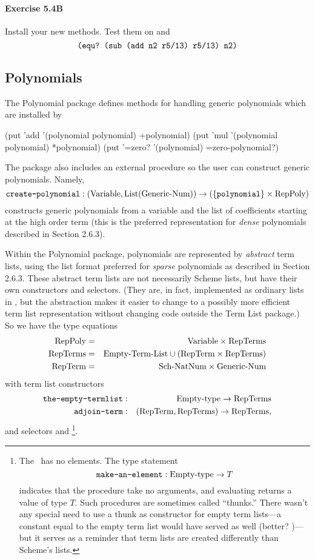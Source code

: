 \paragraph{Exercise 5.4B}
Install your new methods.  Test them on  and
\[\mbox{\tt (equ?\ (sub (add n2 r5/13) r5/13) n2)}\]


\subsection{Polynomials}
The Polynomial package defines methods for handling generic polynomials
which are installed by

\beginlisp
(put 'add '(polynomial polynomial) +polynomial)
(put 'mul '(polynomial polynomial) *polynomial)
(put '=zero? '(polynomial) =zero-polynomial?)
\endlisp

The package also includes an external procedure so the user can construct
generic polynomials.  Namely,
\[\mbox{\tt create-polynomial}: (\mbox{Variable}, \mbox{List}(\mbox{Generic-\-Num})) \rightarrow (\{\mbox{\tt polynomial}\}\times
\mbox{RepPoly})\]
constructs generic polynomials from a variable and the list of
coefficients starting at the high order term (this is the preferred
representation for {\em dense} polynomials described in Section 2.6.3).

Within the Polynomial package, polynomials are represented by {\em
abstract} term lists, using the list format preferred for {\em sparse}
polynomials as described in Section 2.6.3.  These abstract term lists are
not necessarily Scheme lists, but have their own constructors and
selectors.  (They are, in fact, implemented as ordinary lists in
, but the abstraction makes it easier to change to a
possibly more efficient term list representation without changing code
outside the Term List package.)  So we have the type equations
\begin{eqnarray*}
\mbox{RepPoly}  & = & \mbox{Variable}\times\mbox{RepTerms}\\
\mbox{RepTerms}  & = & \mbox{Empty-Term-List}  \cup  (\mbox{RepTerm} \times \mbox{RepTerms})\\
\mbox{RepTerm} & = & \mbox{Sch-\-NatNum} \times \mbox{Generic-\-Num}
\end{eqnarray*}
with term list constructors
\begin{eqnarray*}
\mbox{\tt the-empty-termlist} &:& \mbox{Empty-type} \rightarrow \mbox{RepTerms}\\
\mbox{\tt adjoin-term} &:& (\mbox{RepTerm}, \mbox{RepTerms}) \rightarrow \mbox{RepTerms},
\end{eqnarray*}
and selectors  and \footnote{The \Empty\
has no elements.  The type statement
\[ : \Empty \to T\]
indicates that the procedure \Code{make-an-element} take no arguments, and
evaluating \Code{(make-an-element)} returns a value of type $T$.  Such
procedures are sometimes called ``thunks.''  There wasn't any special need
to use a thunk as constructor for empty term lists---a constant equal to
the empty term list would have served as well (better? \Code{:-)})---but
it serves as a reminder that term lists are created differently than
Scheme's lists.}.

